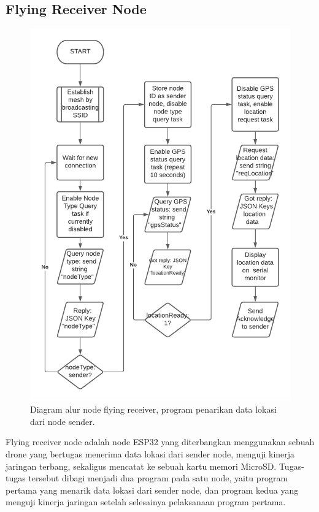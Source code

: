 \subsection{Flying Receiver Node}
\begin{figure}[H]
	\centering
	\includegraphics[scale=0.6]{./assets/FlowchartReceiver}
	\caption{Diagram alur node flying receiver, program penarikan data lokasi dari node sender.}
\end{figure}
Flying receiver node adalah node ESP32 yang diterbangkan menggunakan sebuah drone yang bertugas menerima data lokasi dari sender node, menguji kinerja jaringan terbang, sekaligus mencatat ke sebuah kartu memori MicroSD. Tugas-tugas tersebut dibagi menjadi dua program pada satu node, yaitu program pertama yang menarik data lokasi dari sender node, dan program kedua yang menguji kinerja jaringan setelah selesainya pelaksanaan program pertama.

